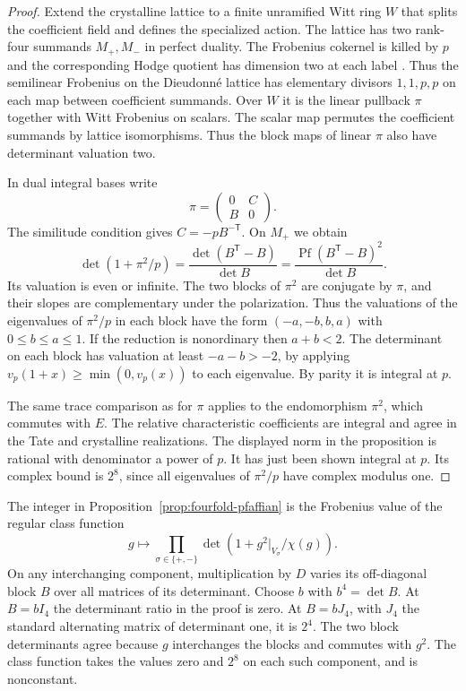\begin{proof}
Extend the crystalline lattice to a finite unramified Witt ring
\(W\) that splits the coefficient field and defines the specialized
action. The lattice has two rank-four summands \(M_+,M_-\) in perfect
duality. The Frobenius cokernel is killed by \(p\) and the corresponding
Hodge quotient has dimension two at each label
\cite[\S\S1.1.3 and 1.3.1]{moonencanonical}. Thus the semilinear
Frobenius on the Dieudonn\'e lattice has elementary divisors
\(1,1,p,p\) on each map between coefficient summands. Over \(W\) it
is the linear pullback \(\pi\) together with Witt Frobenius on scalars.
The scalar map permutes the coefficient summands by lattice
isomorphisms. Thus the block maps of linear \(\pi\) also have
determinant valuation two.

In dual integral bases write
\[
 \pi=\begin{pmatrix}0&C\\ B&0\end{pmatrix}.
\]
The similitude condition gives \(C=-p B^{-\mathsf T}\). On \(M_+\)
we obtain
\[
 \det(1+\pi^2/p)=\frac{\det(B^{\mathsf T}-B)}{\det B}
               =\frac{\operatorname{Pf}(B^{\mathsf T}-B)^2}{\det B}.
\]
Its valuation is even or infinite. The two blocks of \(\pi^2\) are
conjugate by \(\pi\), and their slopes are complementary under the
polarization. Thus the valuations of the eigenvalues of \(\pi^2/p\)
in each block have the form \((-a,-b,b,a)\) with
\(0\le b\le a\le1\). If the reduction is nonordinary then \(a+b<2\).
The determinant on each block has valuation at least \(-a-b>-2\),
by applying \(v_p(1+x)\ge\min(0,v_p(x))\) to each eigenvalue. By
parity it is integral at \(p\).

The same trace comparison as for \(\pi\) applies to the endomorphism
\(\pi^2\), which commutes with \(E\). The relative characteristic
coefficients are integral and agree in the Tate and crystalline
realizations. The displayed norm in the proposition is rational
with denominator a power of \(p\). It has just been shown integral
at \(p\). Its complex bound is \(2^8\), since all eigenvalues of
\(\pi^2/p\) have complex modulus one.
\end{proof}

The integer in Proposition~\ref{prop:fourfold-pfaffian} is the
Frobenius value of the regular class function
\[
 g\longmapsto
 \prod_{\sigma\in\{+,-\}}
   \det\!\left(1+g^2|_{V_\sigma}/\chi(g)\right).
\]
On any interchanging component, multiplication by \(D\) varies its
off-diagonal block \(B\) over all matrices of its determinant. Choose
\(b\) with \(b^4=\det B\). At \(B=b I_4\) the determinant ratio in
the proof is zero. At \(B=b J_4\), with \(J_4\) the standard
alternating matrix of determinant one, it is \(2^4\). The two
block determinants agree because \(g\) interchanges the blocks and
commutes with \(g^2\). The class function takes the values zero and
\(2^8\) on each such component, and is nonconstant.


